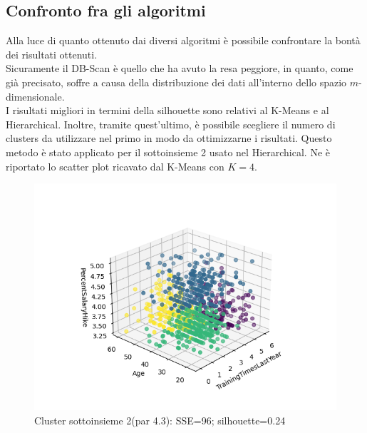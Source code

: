 \documentclass[a4paper,9pt]{article}
\begin{document}

\subsection{Confronto fra gli algoritmi}
Alla luce di quanto ottenuto dai diversi algoritmi è possibile confrontare la bontà dei risultati ottenuti.\\
Sicuramente il DB-Scan è quello che ha avuto la resa peggiore, in quanto, come già precisato, soffre a causa della distribuzione dei dati all'interno dello spazio $m$-dimensionale.\\
I risultati migliori in termini della silhouette sono relativi al K-Means e al Hierarchical. Inoltre, tramite quest'ultimo, è possibile scegliere il numero di clusters da utilizzare nel primo in modo da ottimizzarne i risultati. Questo metodo è stato applicato per il sottoinsieme 2 usato nel Hierarchical.
Ne è riportato lo scatter plot ricavato dal K-Means con $K=4$.
\begin{figure}[H]
    \centering
    \includegraphics[scale=0.65]{FromHierarchicalKmeansDF2.png}
    \caption{Cluster sottoinsieme 2(par 4.3): SSE=96; silhouette=0.24 }
    \label{fig:my_label}
\end{figure}
\end{document}
